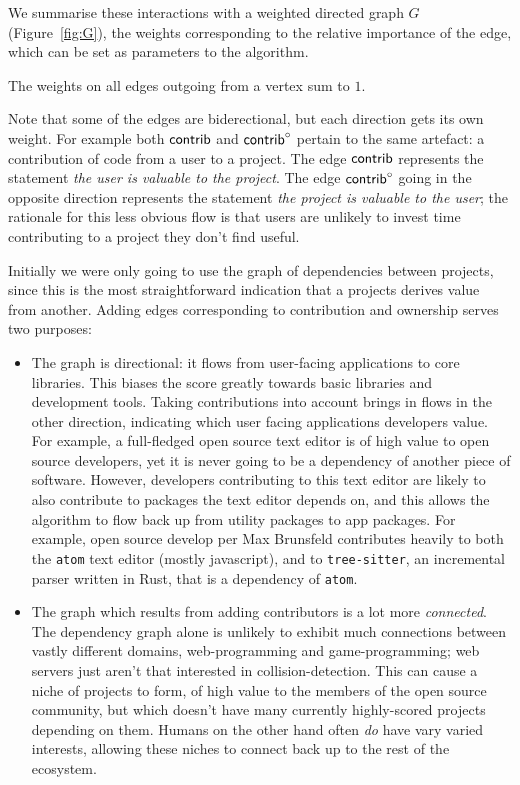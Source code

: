 
We summarise these interactions with a weighted directed graph $G$
(Figure~\ref{fig:G}), the weights corresponding to the relative importance of
the edge, which can be set as parameters to the algorithm.


The weights on all edges outgoing from a vertex sum to $1$.

Note that some of the edges are biderectional, but each direction gets
its own weight. For example both $\mathsf{contrib}$ and $\mathsf{contrib}^\circ$ pertain to
the same artefact: a contribution of code from a user to a
project. The edge $\mathsf{contrib}$ represents the statement \emph{the user
  is valuable to the project}. The edge $\mathsf{contrib}^\circ$ going in the
opposite direction represents the statement \emph{the project is
  valuable to the user}; the rationale for this less obvious flow is
that users are unlikely to invest time contributing to a project they
don't find useful.


Initially we were only going to use the graph of dependencies between projects,
since this is the most straightforward indication that a projects derives value
from another. Adding edges corresponding to contribution and ownership serves
two purposes:
\begin{itemize}
\item The graph is directional: it flows from user-facing applications to core
  libraries. This biases the score greatly towards basic libraries and
  development tools. Taking contributions into account brings in flows in the
  other direction, indicating which user facing applications developers
  value. For example, a full-fledged open source text editor is of high value to
  open source developers, yet it is never going to be a dependency of another
  piece of software. However, developers contributing to this text editor are
  likely to also contribute to packages the text editor depends on, and this
  allows the algorithm to flow back up from utility packages to app
  packages. For example, open source develop per Max Brunsfeld contributes
  heavily to both the \texttt{atom} text editor (mostly javascript), and to
  \texttt{tree-sitter}, an incremental parser written in Rust, that is a
  dependency of \texttt{atom}.
\item The graph which results from adding contributors is a lot more
  \emph{connected}. The dependency graph alone is unlikely to exhibit much
  connections between vastly different domains, \eg{} web-programming and
  game-programming; web servers just aren't that interested in
  collision-detection. This can cause a niche of projects to form, of high value
  to the members of the open source community, but which doesn't have many
  currently highly-scored projects depending on them. Humans on the other hand
  often \emph{do} have vary varied interests, allowing these niches to connect
  back up to the rest of the ecosystem.
\end{itemize}

